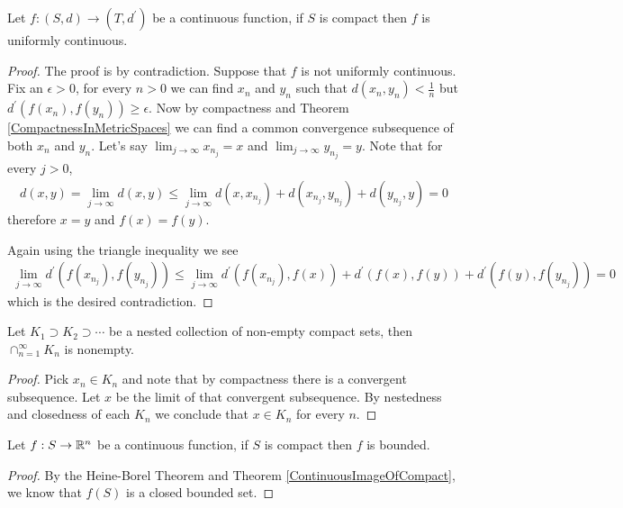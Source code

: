 \begin{thm}\label{UniformContinuityOnCompactSets} Let $f : (S,d) \to (T, d^\prime)$ be a continuous function, if $S$ is
  compact then $f$ is uniformly continuous.
\end{thm}
\begin{proof}
The proof is by contradiction.  Suppose that $f$ is not uniformly
continuous.  Fix an $\epsilon > 0$, for every $n > 0$ we can find
$x_n$ and $y_n$ such that $d(x_n, y_n) < \frac{1}{n}$ but
$d^\prime(f(x_n), f(y_n)) \geq \epsilon$.  Now by compactness and Theorem
\ref{CompactnessInMetricSpaces} we can find a
common convergence subsequence of both $x_n$ and $y_n$.  Let's say
$\lim_{j \to \infty} x_{n_j} = x$ and $\lim_{j \to \infty} y_{n_j} =
y$.  Note that for every $j>0$, 
\begin{align*}
d(x,y) = \lim_{j \to \infty } d(x,y)\leq \lim_{j \to \infty } d(x,
x_{n_j}) + d(x_{n_j}, y_{n_j}) + d(y_{n_j}, y) = 0
\end{align*}
therefore $x=y$ and $f(x)=f(y)$.  

Again using the triangle inequality we see
\begin{align*}
\lim_{j \to \infty} d^\prime(f(x_{n_j}), f(y_{n_j})) \leq \lim_{j \to \infty}
d^\prime(f(x_{n_j}), f(x)) + d^\prime(f(x), f(y)) + d^\prime(f(y), f(y_{n_j})) = 0
\end{align*}
which is the desired contradiction.
\end{proof}

\begin{lem}\label{IntersectionOfNestedCompactSets}Let $K_1 \supset K_2
  \supset \cdots$ be a nested collection of non-empty compact sets,
  then $\cap_{n=1}^\infty K_n$ is nonempty.
\end{lem}
\begin{proof}Pick $x_n \in K_n$ and note that by compactness there is
  a convergent subsequence.  Let $x$ be the limit of that convergent
  subsequence.  By nestedness and closedness of each $K_n$ we conclude
  that $x \in K_n$ for every $n$.
\end{proof}

\begin{thm}Let $f : S \to \mathbb{R}^n$ be a continuous function, if $S$ is
  compact then $f$ is bounded.
\end{thm}
\begin{proof}
By the Heine-Borel Theorem and Theorem \ref{ContinuousImageOfCompact}, we know that $f(S)$ is a closed bounded set.
\end{proof}

